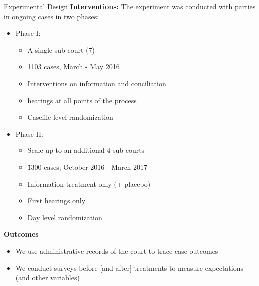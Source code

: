 \documentclass[9pt]{beamer}
\begin{document}
\begin{frame}{Experimental Design}{}
\textbf{Interventions:} The experiment was conducted with parties in ongoing cases in two phases:
   \begin{itemize}
       \item Phase I: 
       \begin{itemize}
           \item A single sub-court (7)
           \item 1103 cases, March - May 2016
           \item Interventions on information and conciliation
           \item hearings at all points of the process
           \item Casefile level randomization
       \end{itemize}
  \pause     
       \item Phase II: 
       \begin{itemize}
           \item Scale-up to an additional 4 sub-courts
           \item \~1300 cases, October 2016 - March 2017
           \item Information treatment only (+ placebo)
           \item First hearings only
           \item Day level randomization
       \end{itemize}
       \end{itemize}
\pause
       \item \textbf{Outcomes}
       \begin{itemize}
           \item We use administrative records of the court to trace case outcomes
           \item We conduct surveys before [and after] treatments to measure expectations (and other variables)
       \end{itemize}

\end{frame}
\end{document}

